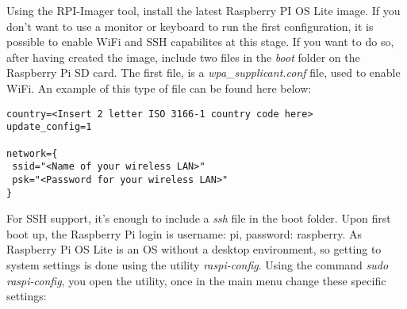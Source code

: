 \documentclass[a4paper,11pt]{scrartcl}
\begin{document}
Using the RPI-Imager tool, install the latest Raspberry PI OS Lite image. If you don't want to use a monitor or keyboard to run the first configuration, it is possible to enable WiFi and SSH capabilites at this stage. If you want to do so, after having created the image, include two files in the \textit{boot} folder on the Raspberry Pi SD card. The first file, is a \textit{wpa\_supplicant.conf} file, used to enable WiFi. An example of this type of file can be found here below:
\begin{lstlisting}
country=<Insert 2 letter ISO 3166-1 country code here>
update_config=1

network={
 ssid="<Name of your wireless LAN>"
 psk="<Password for your wireless LAN>"
}
\end{lstlisting}
For SSH support, it's enough to include a \textit{ssh} file in the boot folder.
Upon first boot up, the Raspberry Pi login is username: pi, password: raspberry.
As Raspberry Pi OS Lite is an OS without a desktop environment, so getting to system settings is done using the utility \textit{raspi-config}. 
Using the command \textit{sudo raspi-config}, you open the utility, once in the main menu change these specific settings:
\end{document}
